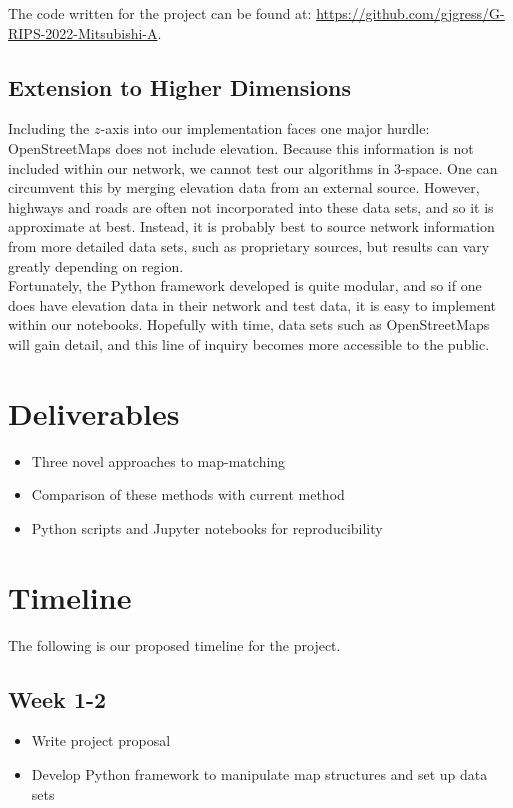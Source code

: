 \documentclass{article}
\numberwithin{equation}{section}
\theoremstyle{definition}
\begin{document}
The code written for the project can be found at:  \url{https://github.com/gjgress/G-RIPS-2022-Mitsubishi-A}.

\subsection{Extension to Higher Dimensions}

Including the $z$-axis into our implementation faces one major hurdle: OpenStreetMaps does not include elevation. Because this information is not included within our network, we cannot test our algorithms in $3$-space. One can circumvent this by merging elevation data from an external source. However, highways and roads are often not incorporated into these data sets, and so it is approximate at best. Instead, it is probably best to source network information from more detailed data sets, such as proprietary sources, but results can vary greatly depending on region.\\

Fortunately, the Python framework developed is quite modular, and so if one does have elevation data in their network and test data, it is easy to implement within our notebooks. Hopefully with time, data sets such as OpenStreetMaps will gain detail, and this line of inquiry becomes more accessible to the public.

\section{Deliverables}
\begin{itemize}
    \item Three novel approaches to map-matching 
    \item Comparison of these methods with current method
    \item Python scripts and Jupyter notebooks for reproducibility
\end{itemize}
 

\section{Timeline}
The following is our proposed timeline for the project. 

\subsection*{Week 1-2}
\begin{itemize}[noitemsep]
    \item Write project proposal
    \item Develop Python framework to manipulate map structures and set up data sets
\end{itemize}
\end{document}
